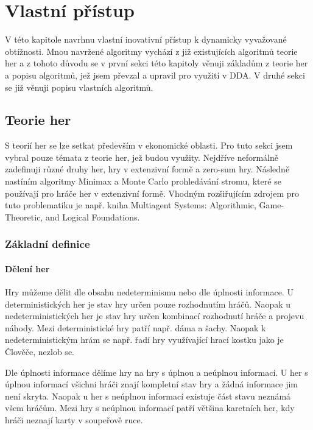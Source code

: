 \chapter{Vlastní přístup}

V této kapitole navrhnu vlastní inovativní přístup k dynamicky vyvažované obtížnosti. Mnou navržené algoritmy vychází z již existujících algoritmů teorie her a z tohoto důvodu se v první sekci této kapitoly věnuji základům z teorie her a popisu algoritmů, jež jsem převzal a upravil pro využití v DDA. V druhé sekci se již věnuji popisu vlastních algoritmů.

\section{Teorie her}

S teorií her se lze setkat především v ekonomické oblasti. Pro tuto sekci jsem vybral pouze témata z teorie her, jež budou využity. Nejdříve neformálně zadefinuji různé druhy her, hry v extenzivní formě a zero-sum hry. Následně nastíním algoritmy Minimax a Monte Carlo prohledávání stromu, které se používají pro hráče her v extenzivní formě. Vhodným rozšiřujícím zdrojem pro tuto problematiku je např. kniha Multiagent Systems: Algorithmic, Game-Theoretic, and Logical Foundations\cite{Shoham:2008:MSA:1483085}.

\subsection{Základní definice}

\subsubsection{Dělení her}

Hry můžeme dělit dle obsahu nedeterminismu nebo dle úplnosti informace. U deterministických her je stav hry určen pouze rozhodnutím hráčů. Naopak u nedeterministických her je stav hry určen kombinací rozhodnutí hráče a projevu náhody. Mezi deterministické hry patří např. dáma a šachy. Naopak k nedeterministickým hrám se např. řadí hry využívající hrací kostku jako je Člověče, nezlob se.

Dle úplnosti informace dělíme hry na hry s úplnou a neúplnou informací. U her s úplnou informací všichni hráči znají kompletní stav hry a žádná informace jim není skryta. Naopak u her s neúplnou informací existuje část stavu neznámá všem hráčům. Mezi hry s neúplnou informací patří většina karetních her, kdy hráči neznají karty v soupeřově ruce.

